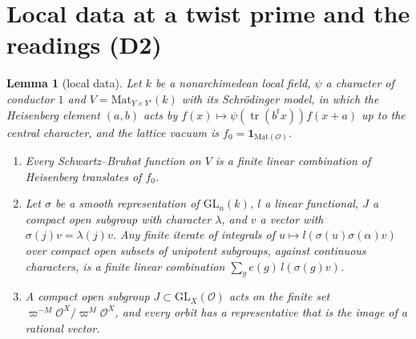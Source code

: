 \documentclass[11pt]{article}
\newcommand{\Ok}{\mathcal O}
\newcommand{\GL}{\mathrm{GL}}
\newcommand{\Mat}{\mathrm{Mat}}
\newtheorem{lemma}[theorem]{Lemma}
\theoremstyle{definition}
\theoremstyle{remark}
\begin{document}
\section{Local data at a twist prime and the readings (D2)}\label{sec:L}

\begin{lemma}[local data]\label{lem:L}
Let $k$ be a nonarchimedean local field, $\psi$ a character of conductor $1$ and $V=\Mat_{Y\times Y'}(k)$ with its Schr\"odinger model, in which the Heisenberg element $(a,b)$ acts by $f(x)\mapsto\psi(\operatorname{tr}(b^{t}x))f(x+a)$ up to the central character, and the lattice vacuum is $f_0=\mathbf 1_{\Mat(\Ok)}$.
\begin{enumerate}[label=(\alph*),itemsep=1pt]
\item Every Schwartz--Bruhat function on $V$ is a finite linear combination of Heisenberg translates of $f_0$.
\item Let $\sigma$ be a smooth representation of $\GL_n(k)$, $l$ a linear functional, $J$ a compact open subgroup with character $\lambda$, and $v$ a vector with $\sigma(j)v=\lambda(j)v$. Any finite iterate of integrals of $u\mapsto l(\sigma(u)\sigma(\alpha)v)$ over compact open subsets of unipotent subgroups, against continuous characters, is a finite linear combination $\sum_g e(g)\,l(\sigma(g)v)$.
\item A compact open subgroup $J\subset\GL_X(\Ok)$ acts on the finite set $\varpi^{-M}\Ok^{X}/\varpi^{M}\Ok^{X}$, and every orbit has a representative that is the image of a rational vector.
\end{enumerate}
\end{lemma}
\end{document}
